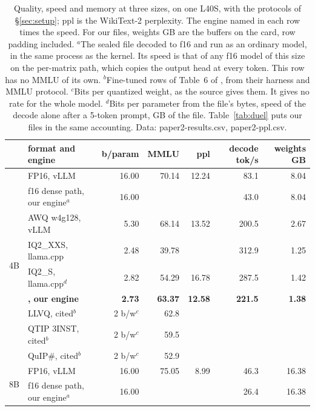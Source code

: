 \begin{table}[t]
\centering\small\setlength{\tabcolsep}{3.2pt}
\caption{Quality, speed and memory at three sizes, on one L40S, with the
protocols of \S\ref{sec:setup}; ppl is the WikiText-2 perplexity. The engine
named in each row times the speed. For our files, weights GB are the buffers
on the card, row padding included. $^{a}$The sealed file decoded to f16 and run as an ordinary model,
in the same process as the kernel. Its speed is that of any f16 model of this
size on the per-matrix path, which copies the output head at
every token. This row has no MMLU of its own. $^{b}$Fine-tuned rows of Table~6 of \citet{llvq2026}, from
their harness and MMLU protocol. $^{c}$Bits per quantized weight, as the source
gives them. It gives no rate for the whole model. $^{d}$Bits per parameter
from the file's bytes, speed of the decode alone after a 5-token prompt, GB of
the file. Table~\ref{tab:duel} puts our files in the same accounting. Data:
paper2-results.csv, paper2-ppl.csv.}
\label{tab:main}
\begin{tabular}{llrrrrr}
\toprule
 & format and engine & b/param & MMLU & ppl & decode tok/s & weights GB\\
\midrule
\multirow{9}{*}{4B}
 & FP16, vLLM & 16.00 & 70.14 & 12.24 & 83.1 & 8.04\\
 & f16 dense path, our engine$^{a}$ & 16.00 & & & 43.0 & 8.04\\
 & AWQ w4g128, vLLM & 5.30 & 68.14 & 13.52 & 200.5 & 2.67\\
 & IQ2\_XXS, llama.cpp & 2.48 & 39.78 & & 312.9 & 1.25\\
 & IQ2\_S, llama.cpp$^{d}$ & 2.82 & 54.29 & 16.78 & 287.5 & 1.42\\
 & \textbf{\Tetra{}, our engine} & \textbf{2.73} & \textbf{63.37} & \textbf{12.58} & \textbf{221.5} & \textbf{1.38}\\
 & \textcolor{okGray}{LLVQ, cited$^{b}$} & \textcolor{okGray}{2 b/w$^{c}$} & \textcolor{okGray}{62.8} & & & \\
 & \textcolor{okGray}{QTIP 3INST, cited$^{b}$} & \textcolor{okGray}{2 b/w$^{c}$} & \textcolor{okGray}{59.5} & & & \\
 & \textcolor{okGray}{QuIP\#, cited$^{b}$} & \textcolor{okGray}{2 b/w$^{c}$} & \textcolor{okGray}{52.9} & & & \\
\midrule
\multirow{5}{*}{8B}
 & FP16, vLLM & 16.00 & 75.05 & 8.99 & 46.3 & 16.38\\
 & f16 dense path, our engine$^{a}$ & 16.00 & & & 26.4 & 16.38\\

\end{tabular}
\end{table}
